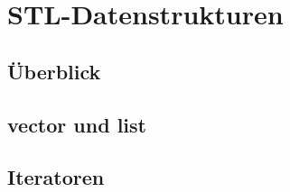 \section{STL-Datenstrukturen}

\subsection{Überblick}


\subsection{vector und list}


\subsection{Iteratoren}


